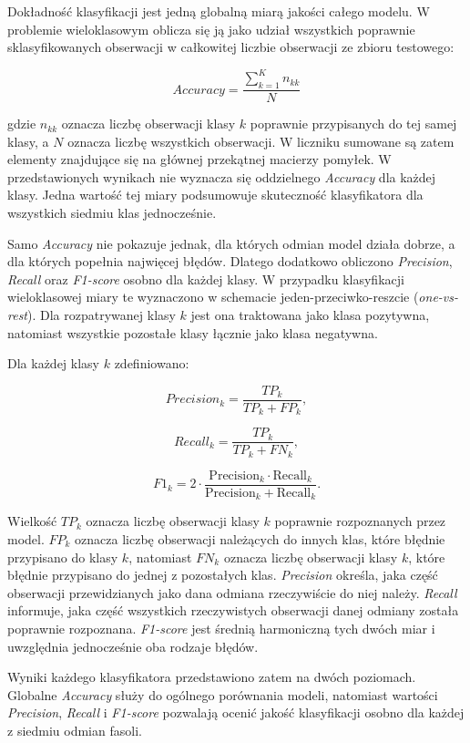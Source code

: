 \documentclass{report}
\begin{document}
Dokładność klasyfikacji jest jedną globalną miarą jakości całego modelu. W problemie wieloklasowym oblicza się ją jako udział wszystkich poprawnie sklasyfikowanych obserwacji w całkowitej liczbie obserwacji ze zbioru testowego:

\[
Accuracy = \frac{\sum_{k=1}^{K} n_{kk}}{N}
\]

gdzie $n_{kk}$ oznacza liczbę obserwacji klasy $k$ poprawnie przypisanych do tej samej klasy, a $N$ oznacza liczbę wszystkich obserwacji. W liczniku sumowane są zatem elementy znajdujące się na głównej przekątnej macierzy pomyłek. W przedstawionych wynikach nie wyznacza się oddzielnego \textit{Accuracy} dla każdej klasy. Jedna wartość tej miary podsumowuje skuteczność klasyfikatora dla wszystkich siedmiu klas jednocześnie.

Samo \textit{Accuracy} nie pokazuje jednak, dla których odmian model działa dobrze, a dla których popełnia najwięcej błędów. Dlatego dodatkowo obliczono \textit{Precision}, \textit{Recall} oraz \textit{F1-score} osobno dla każdej klasy. W przypadku klasyfikacji wieloklasowej miary te wyznaczono w schemacie jeden-przeciwko-reszcie (\textit{one-vs-rest}). Dla rozpatrywanej klasy $k$ jest ona traktowana jako klasa pozytywna, natomiast wszystkie pozostałe klasy łącznie jako klasa negatywna.

Dla każdej klasy $k$ zdefiniowano:

\[
Precision_k=\frac{TP_k}{TP_k+FP_k},
\]

\[
Recall_k=\frac{TP_k}{TP_k+FN_k},
\]

\[
F1_k=2\cdot\frac{\mathrm{Precision}_k\cdot\mathrm{Recall}_k}
{\mathrm{Precision}_k+\mathrm{Recall}_k}.
\]

Wielkość $TP_k$ oznacza liczbę obserwacji klasy $k$ poprawnie rozpoznanych przez model. $FP_k$ oznacza liczbę obserwacji należących do innych klas, które błędnie przypisano do klasy $k$, natomiast $FN_k$ oznacza liczbę obserwacji klasy $k$, które błędnie przypisano do jednej z pozostałych klas. \textit{Precision} określa, jaka część obserwacji przewidzianych jako dana odmiana rzeczywiście do niej należy. \textit{Recall} informuje, jaka część wszystkich rzeczywistych obserwacji danej odmiany została poprawnie rozpoznana. \textit{F1-score} jest średnią harmoniczną tych dwóch miar i uwzględnia jednocześnie oba rodzaje błędów.

Wyniki każdego klasyfikatora przedstawiono zatem na dwóch poziomach. Globalne \textit{Accuracy} służy do ogólnego porównania modeli, natomiast wartości \textit{Precision}, \textit{Recall} i \textit{F1-score} pozwalają ocenić jakość klasyfikacji osobno dla każdej z siedmiu odmian fasoli.
\end{document}
